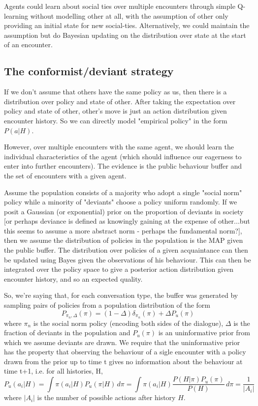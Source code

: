 \documentclass[a4paper]{report}
\begin{document}
Agents could learn about social ties over multiple encounters through simple Q-learning without modelling other at all, with the assumption of other only providing an initial state for new social-ties. Alternatively, we could maintain the assumption but do Bayesian updating on the distribution over state at the start of an encounter.



\subsection{The conformist/deviant strategy}

If we don't assume that others have the same policy as us, then there is a distribution over policy and state of other. After taking the expectation over policy and state of other, other's move is just an action distribution given encounter history. So we can directly model "empirical policy" in the form $P(a|H)$.

However, over multiple encounters with the same agent, we should learn the individual characteristics of the agent (which should influence our eagerness to enter into further encounters). The evidence is the public behaviour buffer and the set of encounters with a given agent.

Assume the population consists of a majority who adopt a single "social norm" policy while a minority of "deviants" choose a policy uniform randomly. If we posit a Gaussian (or exponential) prior on the proportion of deviants in society [or perhaps deviance is defined as knowingly gaining at the expense of other...but this seems to assume a more abstract norm - perhaps the fundamental norm?], then we assume the distribution of policies in the population is the MAP given the public buffer. The distribution over policies of a given acquaintance can then be updated using Bayes given the observations of his behaviour. This can then be integrated over the policy space to give a posterior action distribution given encounter history, and so an expected quality.

So, we're saying that, for each conversation type, the buffer was generated by sampling pairs of policies from a population distribution of the form 
\[
P_{\pi_n,\Delta}(\pi) = (1-\Delta)\delta_{\pi_n}(\pi) + \Delta P_u(\pi)
\]
where $\pi_n$ is the social norm policy (encoding both sides of the dialogue), $\Delta$ is the fraction of deviants in the population and $P_u(\pi)$ is an uninformative prior from which we assume deviants are drawn. We require that the uninformative prior has the property that observing the behaviour of a sigle encounter with a policy drawn from the prior up to time t gives no information about the behaviour at time t+1, i.e. for all histories, H,
\[
P_u(a_i|H) = \int \pi(a_i|H)P_u(\pi|H) \, d\pi = \int \pi(a_i|H)\frac{P(H|\pi)P_u(\pi)}{P(H)} \, d\pi = \frac{1}{|A_i|}
\]
where $|A_i|$ is the number of possible actions after history $H$.
\end{document}
